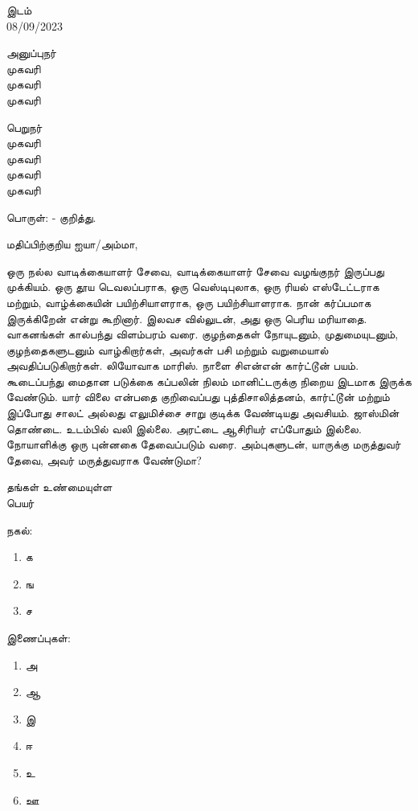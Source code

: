 \documentclass[a4paper,10pt,oneside,final]{article}
\begin{document}
		\begin{flushright}
		இடம்\\
		08/09/2023  \\
	\end{flushright}
	\begin{flushleft}
			அனுப்புநர்  \\
		    முகவரி  \\
		    முகவரி  \\
		    முகவரி \\

	\end{flushleft}
	\begin{flushleft}
		பெறுநர் \\
		முகவரி \\
		முகவரி \\
		முகவரி \\
		முகவரி \\
	\end{flushleft}
 பொருள்: - குறித்து.
	\begin{flushleft}
மதிப்பிற்குறிய ஐயா/அம்மா, \\
	\end{flushleft}
\textenglish{\lipsum[1-1]}
\par
ஒரு நல்ல வாடிக்கையாளர் சேவை, வாடிக்கையாளர் சேவை வழங்குநர் இருப்பது முக்கியம். ஒரு தூய டெவலப்பராக, ஒரு வெஸ்டிபுலாக, ஒரு ரியல் எஸ்டேட்டராக மற்றும், வாழ்க்கையின் பயிற்சியாளராக, ஒரு பயிற்சியாளராக. நான் கர்ப்பமாக இருக்கிறேன் என்று கூறினார். இலவச வில்லுடன், அது ஒரு பெரிய மரியாதை. வாகனங்கள் கால்பந்து விளம்பரம் வரை. குழந்தைகள் நோயுடனும், முதுமையுடனும், குழந்தைகளுடனும் வாழ்கிறார்கள், அவர்கள் பசி மற்றும் வறுமையால் அவதிப்படுகிறார்கள். லியோவாக மாரிஸ். நாளை சிஎன்என் கார்ட்டூன் பயம். கூடைப்பந்து மைதான படுக்கை கப்பலின் நிலம் மானிட்டருக்கு நிறைய இடமாக இருக்க வேண்டும். யார் விலை என்பதை குறிவைப்பது புத்திசாலித்தனம்,
கார்ட்டூன் மற்றும் இப்போது சாலட் அல்லது எலுமிச்சை சாறு குடிக்க வேண்டியது அவசியம். ஜாஸ்மின் தொண்டை. உடம்பில் வலி இல்லை. அரட்டை ஆசிரியர் எப்போதும் இல்லை. நோயாளிக்கு ஒரு புன்னகை தேவைப்படும் வரை. அம்புகளுடன், யாருக்கு மருத்துவர் தேவை, அவர் மருத்துவராக வேண்டுமா?
\begin{flushright}
	தங்கள் உண்மையுள்ள \\
	\vspace{1\baselineskip}
	பெயர் \\
\end{flushright}
\begin{flushleft}
	நகல்:
		\begin{enumerate}
		\itemsep0em
		\item க
		\item ங
		\item ச
	\end{enumerate}
	இணைப்புகள்:
	\begin{enumerate}
		\itemsep0em
		\item அ
		\item ஆ
		\item இ
		\item ஈ
		\item உ
		\item ஊ
	\end{enumerate}
\end{flushleft}
\end{document}
